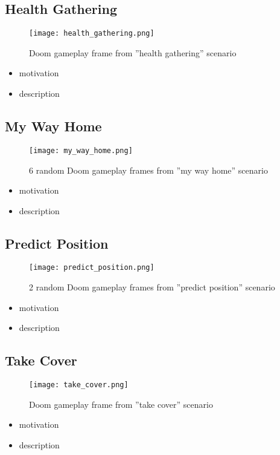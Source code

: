 \newpage
\subsection{Health Gathering}
	\begin{figure}[h]
		\centering
		\texttt{[image: health\_gathering.png]}
		\caption{Doom gameplay frame from ''health gathering'' scenario}
	\end{figure}
\begin{itemize}
	\item motivation
	\item description
\end{itemize}

\newpage
\subsection{My Way Home}
	\begin{figure}[h]
		\centering
		\texttt{[image: my\_way\_home.png]}
		\caption{6 random Doom gameplay frames from ''my way home'' scenario}
	\end{figure}
\begin{itemize}
	\item motivation
	\item description
\end{itemize}

\newpage
\subsection{Predict Position}
	\begin{figure}[h]
		\centering
		\texttt{[image: predict\_position.png]}
		\caption{2 random Doom gameplay frames from ''predict position'' scenario}
	\end{figure}
\begin{itemize}
	\item motivation
	\item description
\end{itemize}

\newpage
\subsection{Take Cover}
	\begin{figure}[h]
		\centering
		\texttt{[image: take\_cover.png]}
		\caption{Doom gameplay frame from ''take cover'' scenario}
	\end{figure}
\begin{itemize}
	\item motivation
	\item description
\end{itemize}

